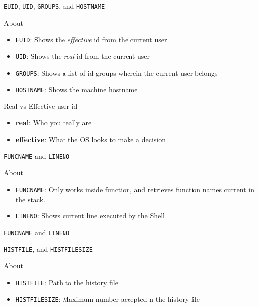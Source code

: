 \documentclass[10pt, compress, aspectratio=169]{beamer}
\begin{document}
\begin{frame}{\texttt{EUID}, \texttt{UID}, \texttt{GROUPS}, and \texttt{HOSTNAME}}
  \begin{exampleblock}{About}
    \begin{itemize}
      \item \texttt{EUID}: Shows the \textit{effective} id from the current user
      \item \texttt{UID}: Shows the \textit{real} id from the current user
      \item \texttt{GROUPS}: Shows a list of id groups wherein the current user
            belongs
      \item \texttt{HOSTNAME}: Shows the machine hostname
    \end{itemize}
  \end{exampleblock}

  \begin{exampleblock}{Real vs Effective user id}
    \begin{itemize}
      \item \textbf{real}: Who you really are
      \item \textbf{effective}: What the OS looks to make a decision
    \end{itemize}
  \end{exampleblock}
\end{frame}

\begin{frame}{\texttt{FUNCNAME} and \texttt{LINENO}}
  \begin{exampleblock}{About}
    \begin{itemize}
      \item \texttt{FUNCNAME}: Only works inside function, and retrieves
            function names current in the stack.
      \item \texttt{LINENO}: Shows current line executed by the Shell
    \end{itemize}
  \end{exampleblock}
\end{frame}

\begin{frame}{\texttt{FUNCNAME} and \texttt{LINENO}}
  
\end{frame}

\begin{frame}{\texttt{HISTFILE}, and \texttt{HISTFILESIZE}}
  \begin{exampleblock}{About}
    \begin{itemize}
      \item \texttt{HISTFILE}: Path to the history file
      \item \texttt{HISTFILESIZE}: Maximum number accepted n the history file
    \end{itemize}
  \end{exampleblock}
\end{frame}
\end{document}
